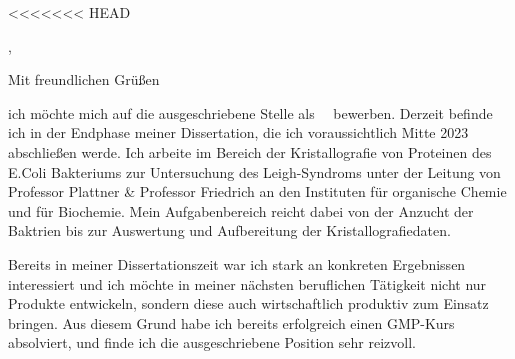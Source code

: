 <<<<<<< HEAD




\recipient{\firma{}}{\adresse{}}
\opening{\anrede{},}
\date{\today}
\closing{Mit freundlichen Grüßen}
{}
\makelettertitle
\justifying



ich möchte mich auf die ausgeschriebene Stelle als \stelleText~\firmaText~bewerben. Derzeit befinde ich in der Endphase meiner Dissertation, die ich voraussichtlich Mitte 2023 abschließen werde. Ich arbeite im Bereich der Kristallografie von Proteinen des E.Coli Bakteriums zur Untersuchung des Leigh-Syndroms unter der Leitung von Professor Plattner \& Professor Friedrich an den Instituten für organische Chemie und für Biochemie. Mein Aufgabenbereich reicht dabei von der Anzucht der Baktrien bis zur Auswertung und Aufbereitung der Kristallografiedaten.\par
Bereits in meiner Dissertationszeit war ich stark an konkreten Ergebnissen interessiert und ich möchte in meiner nächsten beruflichen Tätigkeit nicht nur Produkte entwickeln, sondern diese auch wirtschaftlich produktiv zum Einsatz bringen. Aus diesem Grund habe ich bereits erfolgreich einen GMP-Kurs absolviert, und finde ich die ausgeschriebene Position sehr reizvoll.\par 


